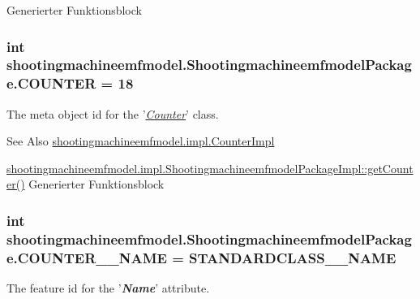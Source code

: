 Generierter Funktionsblock  \hypertarget{interfaceshootingmachineemfmodel_1_1_shootingmachineemfmodel_package_a94a2492dc6388aaef55a19944ca34c22}{
\subsubsection[{C\-O\-U\-N\-T\-E\-R}]{\setlength{\rightskip}{0pt plus 5cm}int shootingmachineemfmodel.\-Shootingmachineemfmodel\-Package.\-C\-O\-U\-N\-T\-E\-R = 18}}\label{interfaceshootingmachineemfmodel_1_1_shootingmachineemfmodel_package_a94a2492dc6388aaef55a19944ca34c22}
The meta object id for the '\hyperlink{classshootingmachineemfmodel_1_1impl_1_1_counter_impl}{{\itshape Counter}}' class.

\begin{DoxySeeAlso}{See Also}
\hyperlink{classshootingmachineemfmodel_1_1impl_1_1_counter_impl}{shootingmachineemfmodel.\-impl.\-Counter\-Impl} 

\hyperlink{classshootingmachineemfmodel_1_1impl_1_1_shootingmachineemfmodel_package_impl_a4cc5fbe52e9a40ce34ed89a9eeeb5b29}{shootingmachineemfmodel.\-impl.\-Shootingmachineemfmodel\-Package\-Impl\-::get\-Counter()} Generierter Funktionsblock 
\end{DoxySeeAlso}
\hypertarget{interfaceshootingmachineemfmodel_1_1_shootingmachineemfmodel_package_abd20c8612d23ade7b29ea8f3e5be6d60}{
\subsubsection[{C\-O\-U\-N\-T\-E\-R\-\_\-\-\_\-\-N\-A\-M\-E}]{\setlength{\rightskip}{0pt plus 5cm}int shootingmachineemfmodel.\-Shootingmachineemfmodel\-Package.\-C\-O\-U\-N\-T\-E\-R\-\_\-\-\_\-\-N\-A\-M\-E = {\bf S\-T\-A\-N\-D\-A\-R\-D\-C\-L\-A\-S\-S\-\_\-\-\_\-\-N\-A\-M\-E}}}\label{interfaceshootingmachineemfmodel_1_1_shootingmachineemfmodel_package_abd20c8612d23ade7b29ea8f3e5be6d60}
The feature id for the '{\itshape {\bfseries Name}}' attribute.

